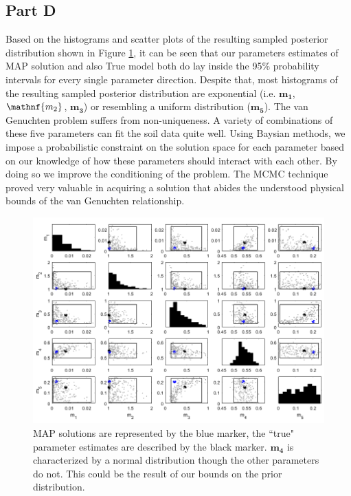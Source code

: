 \documentclass{article}
\begin{document}
\subsection*{Part D}
Based on the histograms and scatter plots of the resulting sampled posterior distribution shown in Figure \ref{fig:2d}, it can be seen that our parameters estimates of MAP solution and also True model both do lay inside the 95\% probability intervals for every single parameter direction. Despite that, most histograms of the resulting sampled posterior distribution are exponential (i.e. $\mathbf{m_1}$, $\mathnf{m_2}$, $\mathbf{m_3}$) or resembling a uniform distribution ($\mathbf{m_5}$). The van Genuchten problem suffers from non-uniqueness. A variety of combinations of these five parameters can fit the soil data quite well. Using Baysian methods, we impose a probabilistic constraint on the solution space for each parameter based on our knowledge of how these parameters should interact with each other. By doing so we improve the conditioning of the problem. The MCMC technique proved very valuable in acquiring a solution that abides the understood physical bounds of the van Genuchten relationship.

\begin{figure}
    \centering
    \includegraphics[width=\textwidth]{2d.png}
    \caption{MAP solutions are represented by the blue marker, the ``true" parameter estimates are described by the black marker. $\mathbf{m_4}$ is characterized by a normal distribution though the other parameters do not. This could be the result of our bounds on the prior distribution.}
    \label{fig:2d}
\end{figure}
\FloatBarrier
\end{document}

